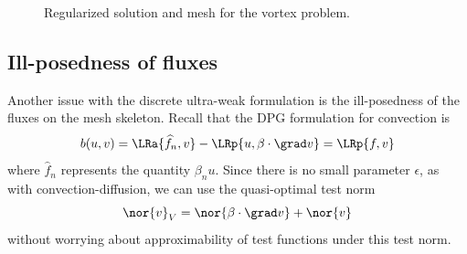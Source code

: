 \begin{figure}[!h]
\centering
{}
\caption{Regularized solution and mesh for the vortex problem.}
\label{fig:convCircResults}
\end{figure}

\subsection{Ill-posedness of fluxes}

Another issue with the discrete ultra-weak formulation is the ill-posedness of the fluxes on the mesh skeleton. Recall that the DPG formulation for convection is
\[
b(u,v) = \LRa{\widehat{f}_n, v} - \LRp{u,\beta\cdot \grad v} = \LRp{f,v}
\]
where $\widehat{f}_n$ represents the quantity $\beta_n u$. Since there is no small parameter $\epsilon$, as with convection-diffusion, we can use the quasi-optimal test norm 
\[
\nor{v}_V = \nor{\beta\cdot \grad v} + \nor{v}
\]
without worrying about approximability of test functions under this test norm. 

